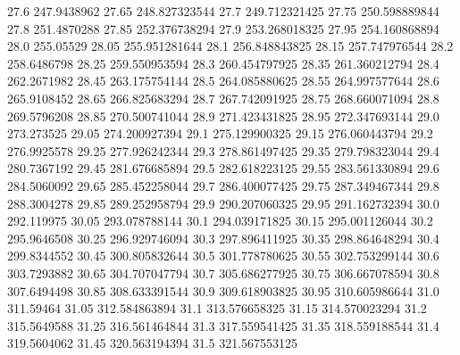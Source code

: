            27.6      247.9438962
          27.65    248.827323544
           27.7    249.712321425
          27.75    250.598889844
           27.8      251.4870288
          27.85    252.376738294
           27.9    253.268018325
          27.95    254.160868894
           28.0        255.05529
          28.05    255.951281644
           28.1    256.848843825
          28.15    257.747976544
           28.2      258.6486798
          28.25    259.550953594
           28.3    260.454797925
          28.35    261.360212794
           28.4      262.2671982
          28.45    263.175754144
           28.5    264.085880625
          28.55    264.997577644
           28.6      265.9108452
          28.65    266.825683294
           28.7    267.742091925
          28.75    268.660071094
           28.8      269.5796208
          28.85    270.500741044
           28.9    271.423431825
          28.95    272.347693144
           29.0       273.273525
          29.05    274.200927394
           29.1    275.129900325
          29.15    276.060443794
           29.2      276.9925578
          29.25    277.926242344
           29.3    278.861497425
          29.35    279.798323044
           29.4      280.7367192
          29.45    281.676685894
           29.5    282.618223125
          29.55    283.561330894
           29.6      284.5060092
          29.65    285.452258044
           29.7    286.400077425
          29.75    287.349467344
           29.8      288.3004278
          29.85    289.252958794
           29.9    290.207060325
          29.95    291.162732394
           30.0       292.119975
          30.05    293.078788144
           30.1    294.039171825
          30.15    295.001126044
           30.2      295.9646508
          30.25    296.929746094
           30.3    297.896411925
          30.35    298.864648294
           30.4      299.8344552
          30.45    300.805832644
           30.5    301.778780625
          30.55    302.753299144
           30.6      303.7293882
          30.65    304.707047794
           30.7    305.686277925
          30.75    306.667078594
           30.8      307.6494498
          30.85    308.633391544
           30.9    309.618903825
          30.95    310.605986644
           31.0        311.59464
          31.05    312.584863894
           31.1    313.576658325
          31.15    314.570023294
           31.2      315.5649588
          31.25    316.561464844
           31.3    317.559541425
          31.35    318.559188544
           31.4      319.5604062
          31.45    320.563194394
           31.5    321.567553125
